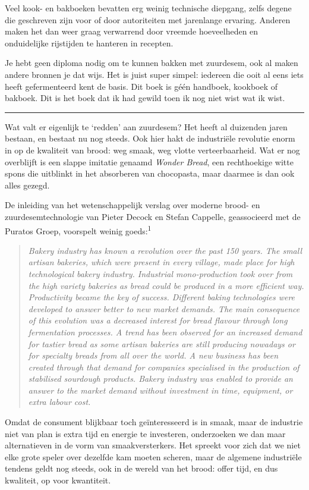 \documentclass[
  11pt,
  dutch,
]{memoir}
\begin{document}
Veel kook- en bakboeken bevatten erg weinig technische diepgang, zelfs
degene die geschreven zijn voor of door autoriteiten met jarenlange
ervaring. Anderen maken het dan weer graag verwarrend door vreemde
hoeveelheden en onduidelijke rijstijden te hanteren in recepten.

Je hebt geen diploma nodig om te kunnen bakken met zuurdesem, ook al
maken andere bronnen je dat wijs. Het is juist super simpel: iedereen
die ooit al eens iets heeft gefermenteerd kent de basis. Dit boek is
géén handboek, kookboek of bakboek. Dit is het boek dat ik had gewild
toen ik nog niet wist wat ik wist.

\pfbreak

Wat valt er eigenlijk te `redden' aan zuurdesem? Het heeft al duizenden
jaren bestaan, en bestaat nu nog steeds. Ook hier hakt de industriële
revolutie enorm in op de kwaliteit van brood: weg smaak, weg vlotte
verteerbaarheid. Wat er nog overblijft is een slappe imitatie genaamd
\emph{Wonder Bread}, een rechthoekige witte spons die uitblinkt in het
absorberen van chocopasta, maar daarmee is dan ook alles gezegd.

De inleiding van het wetenschappelijk verslag over moderne brood- en
zuurdesemtechnologie van Pieter Decock en Stefan Cappelle, geassocieerd
met de Puratos Groep, voorspelt weinig goeds:\textsuperscript{1}

\begin{quote}
\emph{Bakery industry has known a revolution over the past 150 years.
The small artisan bakeries, which were present in every village, made
place for high technological bakery industry. Industrial mono-production
took over from the high variety bakeries as bread could be produced in a
more efficient way. Productivity became the key of success. Different
baking technologies were developed to answer better to new market
demands. The main consequence of this evolution was a decreased interest
for bread flavour through long fermentation processes. A trend has been
observed for an increased demand for tastier bread as some artisan
bakeries are still producing nowadays or for specialty breads from all
over the world. A new business has been created through that demand for
companies specialised in the production of stabilised sourdough
products. Bakery industry was enabled to provide an answer to the market
demand without investment in time, equipment, or extra labour cost.}
\end{quote}

Omdat de consument blijkbaar toch geïnteresseerd is in smaak, maar de
industrie niet van plan is extra tijd en energie te investeren,
onderzoeken we dan maar alternatieven in de vorm van smaakversterkers.
Het spreekt voor zich dat we niet elke grote speler over dezelfde kam
moeten scheren, maar de algemene industriële tendens geldt nog steeds,
ook in de wereld van het brood: offer tijd, en dus kwaliteit, op voor
kwantiteit.
\end{document}
